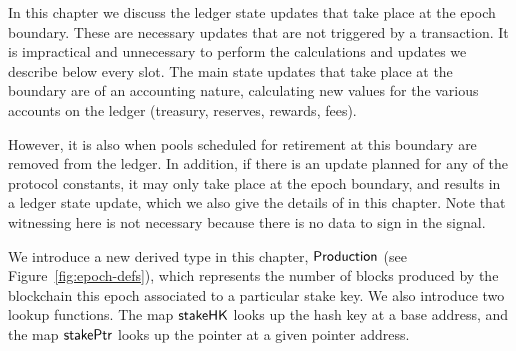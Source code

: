 \newcommand{\UTxOEpState}{\type{UTxOEpState}}
\newcommand{\Accnt}{\type{Accnt}}
\newcommand{\AccntEnv}{\type{AccntEnv}}
\newcommand{\AccntState}{\type{AccntState}}
\newcommand{\StPlCleanEnv}{\type{StPlCleanEnv}}
\newcommand{\StPlCleanState}{\type{StPlCleanState}}
\newcommand{\NewProtoConstsEnv}{\type{NewProtoConstsEnv}}
\newcommand{\NewProtoConstsState}{\type{NewProtoConstsState}}
\newcommand{\EpochEnv}{\type{EpochEnv}}
\newcommand{\EpochState}{\type{EpochState}}
\newcommand{\Production}{\type{Production}}

\newcommand{\obligation}[4]{\fun{obligation}~ \var{#1}~ \var{#2}~ \var{#3}~ \var{#4}}
\newcommand{\reward}[5]{\fun{reward}~ \var{#1}~ \var{#2}~ \var{#3}~ \var{#4}~ \var{#5}}
\newcommand{\isActive}[4]{\fun{isActive}~ \var{#1}~ \var{#2}~ \var{#3}~ \var{#4}}
\newcommand{\activeStake}[5]{\fun{activeStake}~ \var{#1}~ \var{#2}~ \var{#3}~ \var{#4}~ \var{#5}}
\newcommand{\poolRefunds}[3]{\fun{poolRefunds}~ \var{#1}~ \var{#2}~ \var{#3}}

In this chapter we discuss the ledger state updates that take place at the epoch
boundary. These are necessary updates that are not triggered by a transaction.
It is impractical and unnecessary to perform the calculations and updates we
describe below every slot. The main state updates that take place at the boundary
are of an accounting nature, calculating new values for the various accounts
on the ledger (treasury, reserves, rewards, fees).

However, it is also when
pools scheduled for retirement at this boundary are removed from the ledger.
In addition, if there is an update planned for any of the protocol constants,
it may only take place at the epoch boundary, and results in a ledger state
update, which we also give the details of in this chapter.
Note that witnessing here is not necessary because there is no data to sign
in the signal.

We introduce a new derived type in this chapter, $\Production$ (see
Figure~\ref{fig:epoch-defs}), which represents the number of blocks produced by
the blockchain this epoch associated to a particular stake key.
We also introduce two lookup functions. The map $\mathsf{stakeHK}$ looks up the
hash key at a base address, and the map $\mathsf{stakePtr}$ looks up the pointer
at a given pointer address.

